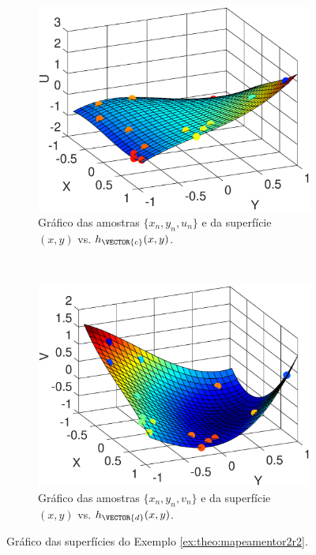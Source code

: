 \begin{figure}[!h]
\centering
    \begin{subfigure}[b]{0.45\textwidth}
        \centering
        \includegraphics[width=\textwidth]{chapters/mapeamento/mfiles/mapeamentor2r2/minimizando_hxc.eps}
        \caption{Gráfico das amostras $\{x_n,y_n,u_n\}$ e da superfície $(x,y)$ vs. $h_{\VECTOR{c}}(x,y)$.}
        \label{fig:theo:maphxr2r1:xnynun}
    \end{subfigure}
    ~
    \begin{subfigure}[b]{0.45\textwidth}
        \centering
        \includegraphics[width=\textwidth]{chapters/mapeamento/mfiles/mapeamentor2r2/minimizando_hxd.eps}
        \caption{Gráfico das amostras $\{x_n,y_n,v_n\}$ e da superfície $(x,y)$ vs. $h_{\VECTOR{d}}(x,y)$.}
        \label{fig:theo:maphxr2r1:xnynvn}
    \end{subfigure}
\caption{Gráfico das superfícies do Exemplo \ref{ex:theo:mapeamentor2r2}.}
\label{fig:theo:maphxr2r1:xnynunvn}
\end{figure}
